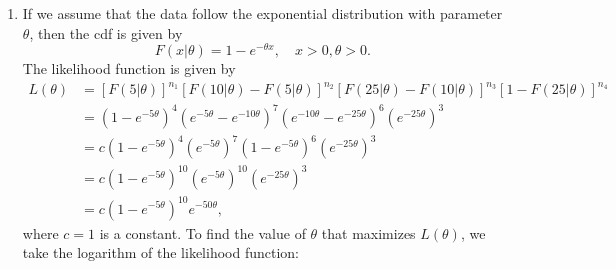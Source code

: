 \begin{solution}
    \begin{enumerate}
        \item If we assume that the data follow the exponential distribution with parameter $\theta$, then the cdf is given by
        \[
            F(x|\theta) = 1 - e^{-\theta x}, \quad x > 0, \theta > 0.
        \]
        The likelihood function is given by
        \begin{align*}
            L(\theta) &= [F(5|\theta)]^{n_1} [F(10|\theta) - F(5|\theta)]^{n_2} [F(25|\theta) - F(10|\theta)]^{n_3} [1 - F(25|\theta)]^{n_4}\\
            &= (1 - e^{-5\theta})^4 (e^{-5\theta} - e^{-10\theta})^7 (e^{-10\theta} - e^{-25\theta})^6 (e^{-25\theta})^3\\
            &= c (1 - e^{-5\theta})^4 (e^{-5\theta})^7 (1 - e^{-5\theta})^6 (e^{-25\theta})^3\\
            &= c (1 - e^{-5\theta})^{10} (e^{-5\theta})^{10} (e^{-25\theta})^3\\
            &= c (1 - e^{-5\theta})^{10} e^{-50\theta},
        \end{align*}
        where $c = 1$ is a constant. To find the value of $\theta$ that maximizes $L(\theta)$, we take the logarithm of the likelihood function:
    

\end{enumerate}
\end{solution}
